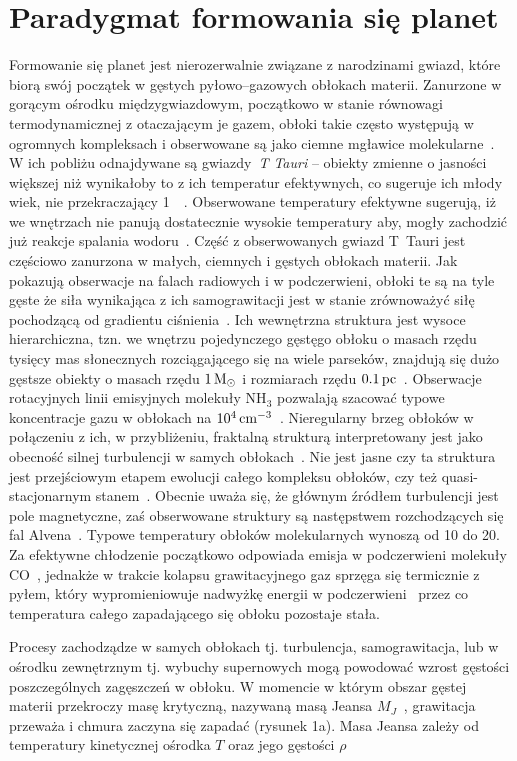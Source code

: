 \section{Paradygmat formowania się planet}
Formowanie się planet jest nierozerwalnie związane z narodzinami gwiazd, które
biorą swój początek w gęstych pyłowo--gazowych obłokach materii. Zanurzone w
gorącym ośrodku międzygwiazdowym, początkowo w stanie równowagi termodynamicznej
z otaczającym je gazem, obłoki takie często występują w ogromnych kompleksach i
obserwowane są jako ciemne mgławice molekularne~\cite{Tielens05}. W ich pobliżu
odnajdywane są gwiazdy~\emph{T Tauri} -- obiekty zmienne o jasności większej niż
wynikałoby to z ich temperatur efektywnych, co sugeruje ich młody wiek, nie
przekraczający 1~\Myr~\cite{H62}. Obserwowane temperatury efektywne sugerują, iż
we wnętrzach nie panują dostatecznie wysokie temperatury aby, mogły zachodzić
już reakcje spalania wodoru~\cite{CK79}. Część z obserwowanych gwiazd T~Tauri
jest częściowo zanurzona w małych, ciemnych i gęstych obłokach materii. Jak
pokazują obserwacje na falach radiowych i w podczerwieni, obłoki te są na tyle
gęste że siła wynikająca z ich samograwitacji jest w stanie zrównoważyć siłę
pochodzącą od gradientu ciśnienia~\cite{WT02}. Ich wewnętrzna struktura jest
wysoce hierarchiczna, tzn. we wnętrzu pojedynczego gęstęgo obłoku o masach rzędu
tysięcy mas słonecznych rozciągającego się na wiele parseków, znajdują się dużo
gęstsze obiekty o masach rzędu $1\hbox{$\mathrm{\thinspace M_{\odot}}$}$ i rozmiarach rzędu $0.1\hbox{$\thinspace\textrm{pc}$}$~\cite{M85,
LSM93}. Obserwacje rotacyjnych linii emisyjnych molekuły NH$_3$ pozwalają
szacować typowe koncentracje gazu w obłokach na $10^{4}\hbox{$\thinspace\textrm{cm}$}^{-3}$~\cite{BM89}.
Nieregularny brzeg obłoków w połączeniu z ich, w przybliżeniu,
fraktalną strukturą interpretowany jest jako obecność silnej turbulencji w
samych obłokach~\cite{E00, FPW91}. Nie jest jasne czy ta struktura jest
przejściowym etapem ewolucji całego kompleksu obłoków, czy też
quasi-stacjonarnym stanem~\cite{L94}. Obecnie uważa się, że głównym źródłem
turbulencji jest pole magnetyczne, zaś obserwowane struktury są następstwem
rozchodzących się fal Alvena~\cite{NP03, MLK04}.
Typowe temperatury obłoków molekularnych wynoszą od 10 do 20\K. Za efektywne
chłodzenie początkowo odpowiada emisja w podczerwieni molekuły CO~\cite{MSWG82},
jednakże w trakcie kolapsu grawitacyjnego gaz sprzęga się termicznie z pyłem,
który wypromieniowuje nadwyżkę energii w podczerwieni~\cite{HN65, MI00} przez co
temperatura całego zapadającego się obłoku pozostaje stała.

\par Procesy zachodządze w samych obłokach tj. turbulencja, samograwitacja, lub
w ośrodku zewnętrznym tj.  wybuchy supernowych mogą powodować wzrost gęstości
poszczególnych zagęszczeń w obłoku. W momencie w którym obszar gęstej materii
przekroczy  masę krytyczną, nazywaną masą Jeansa $M_J$~\cite{J1902, J1928},
grawitacja przeważa i chmura zaczyna się zapadać (rysunek 1a). Masa Jeansa
zależy od temperatury kinetycznej ośrodka $T$ oraz jego gęstości
$\rho$~\cite{H64} 

